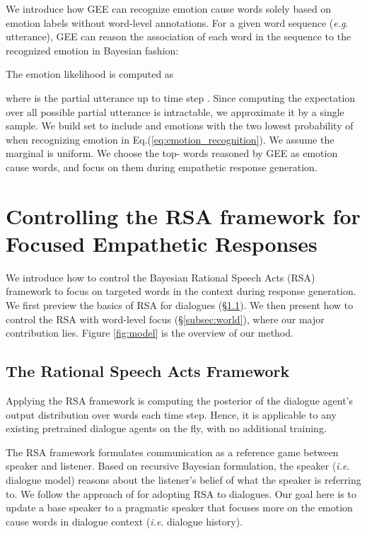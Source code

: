 \documentclass[11pt]{article}
\makeatletter
\DeclareRobustCommand\onedot{\futurelet\@let@token\@onedot}
\def\onedot{. }
\def\eg{\emph{e.g}\onedot} \def\Eg{\emph{E.g}\onedot}
\def\ie{\emph{i.e}\onedot} \def\Ie{\emph{I.e}\onedot}
\makeatother
\begin{document}
We introduce how GEE can recognize emotion cause words solely based on emotion labels without word-level annotations.
For a given word sequence  (\eg utterance),
GEE can reason the association  of each word  in the sequence  to the recognized emotion  in Bayesian fashion:

The emotion likelihood is computed as 

where  is the partial utterance up to time step .
Since computing the expectation over all possible partial utterance  is intractable, we approximate it by a single sample.
We build set  to include  and emotions with the two lowest probability of   when recognizing emotion in Eq.(\ref{eq:emotion_recognition}). 
We assume the marginal  is uniform.
We choose the top- words reasoned by GEE as emotion cause words, and focus on them during empathetic response generation.










\section{Controlling the RSA framework for Focused Empathetic Responses}
\label{sec:generation}

We introduce how to control the Bayesian Rational Speech Acts (RSA) framework \citep{Frank:2012:Science} to focus on targeted words in the context during response generation.
We first preview the basics of RSA for dialogues (\S \ref{subsec:rsa}).
We then present how to control the RSA with word-level focus (\S \ref{subsec:world}), where our major contribution lies.
Figure \ref{fig:model} is the overview of our method.


\subsection{The Rational Speech Acts Framework}
\label{subsec:rsa}

Applying the RSA framework is computing the posterior of the dialogue agent's output distribution over words each time step. Hence, it is applicable to any existing pretrained dialogue agents on the fly, with no additional training.

The RSA framework formulates communication as a reference game between speaker and listener.
Based on recursive Bayesian formulation, the speaker (\ie dialogue model) reasons about the listener's belief of what the speaker is referring to.
We follow the approach of \citet{Kim:2020:EMNLP} for adopting RSA to dialogues.
Our goal here is to update a base speaker  to a pragmatic speaker  that focuses more on the emotion cause words in dialogue context  (\ie dialogue history).
\end{document}
